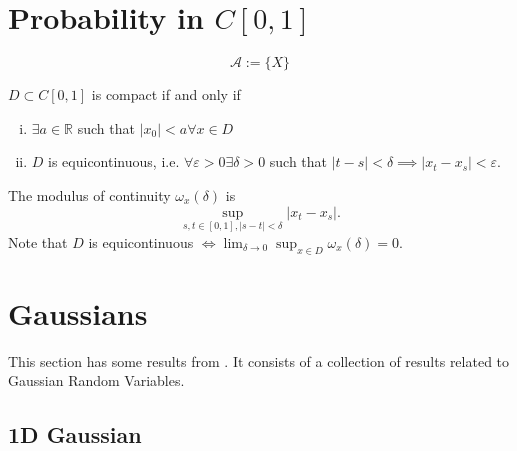 \section{Probability in $C[0,1]$}

\begin{definition}[Cylinder]
	\begin{displaymath}
		\mathcal A := \{
		X
		\}
	\end{displaymath}

\end{definition}

\begin{shaded}
	\begin{note}
		$D \subset C[0,1]$ is compact if and only if
		\begin{enumerate}[(i)]
			\item $\exists a \in \mathbb R$ such that $|x_0|<a \forall x \in D$
			\item $D$ is equicontinuous, i.e. $\forall \varepsilon >0 \exists \delta>0$
			      such that $|t-s|<\delta \implies |x_t - x_s|<\varepsilon$.
		\end{enumerate}
		\begin{definition}
			The modulus of continuity $\omega_x(\delta)$ is
			\begin{displaymath}
				\sup_{s,t \in [0,1], |s-t|<\delta} |x_t - x_s|.
			\end{displaymath}
			Note that $D$ is equicontinuous $\iff \lim_{\delta \to 0} \sup_{x \in D}\omega_x(\delta) = 0$.
		\end{definition}
	\end{note}
\end{shaded}


\section{Gaussians}

This section has some results from \citet{le2016brownian}. It consists of a collection
of results related to Gaussian Random Variables.

\subsection{1D Gaussian}

